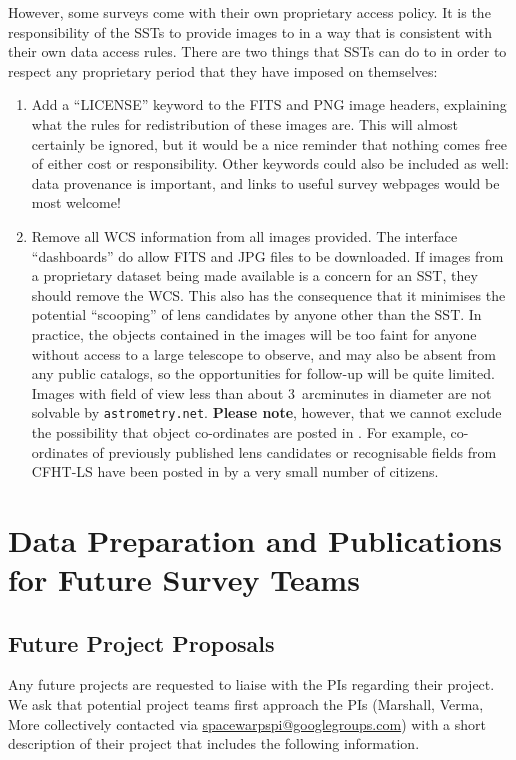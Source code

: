 \documentclass[a4paper]{article}
\begin{document}
However, some surveys come with their own proprietary access policy. It is the responsibility
of the SSTs to provide images to \sw in a way that is consistent
with their own data access rules. There are two things that SSTs can
do to in order to respect any proprietary period that they have imposed on
themselves:
\begin{enumerate}

\item Add a ``LICENSE'' keyword to the FITS and PNG image headers, explaining
what the rules for redistribution of these images are. This will almost
certainly be ignored, but it would be a nice reminder that nothing comes free
of either cost or responsibility. Other keywords could also be included as
well: data provenance is important, and links to useful survey webpages would
be most welcome!

\item Remove all WCS information from all images provided. The \sw interface ``dashboards'' do allow FITS and JPG files to be downloaded. If images from a proprietary dataset being made available is a concern for an SST, they should remove the WCS. This also has the consequence that it minimises the potential ``scooping'' of  lens candidates by anyone other than the SST. 
In practice, the objects contained in the \sw images will be too faint
for anyone without access to a large telescope to observe, and may also be
absent from any public catalogs, so the opportunities for follow-up will be
quite limited. Images
with field of view less than about 3~arcminutes in diameter are not solvable
by \texttt{astrometry.net}. \textbf{Please note}, however, that we cannot exclude the possibility that object co-ordinates are posted in \Talk. For example, co-ordinates of previously published lens candidates or recognisable fields from CFHT-LS have been posted in \Talk by a very small number of citizens.

\end{enumerate}


\section{Data Preparation and Publications for Future Survey Teams}
\label{sec:series}

\subsection{Future Project Proposals}
Any future \sw projects are requested to liaise with the \sw PIs regarding their project. We ask that potential project teams first approach the \sw PIs (Marshall, Verma, More collectively contacted via \href{mailto:spacewarpspi@googlegroups.com}{spacewarpspi@googlegroups.com}) with a short description of their project that includes the following information.
\end{document}
